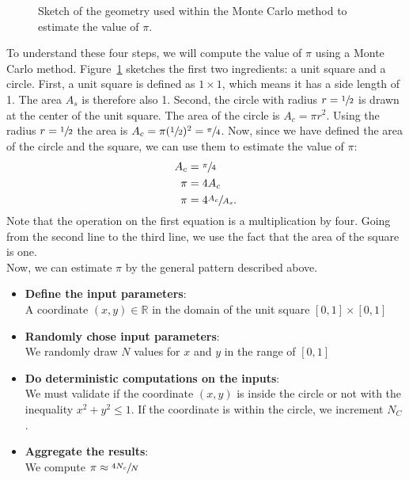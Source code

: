 \begin{figure}[h]
  \begin{center}
  \end{center}
  \caption{Sketch of the geometry used within the Monte Carlo method to estimate the value of $\pi$.}
  \label{fig:monte}
\end{figure}
To understand these four steps, we will compute the value of $\pi$ using a Monte Carlo method. Figure~\ref{fig:monte} sketches the first two ingredients: a unit square and a circle. First, a unit square is defined as $1 \times 1$, which means it has a side length of 1. The area $A_s$ is therefore also 1. Second, the circle with radius $r=\sfrac{1}{2}$ is drawn at the center of the unit square. The area of the circle is $A_c=\pi r^2$. Using the radius $r=\sfrac{1}{2}$ the area is $A_c=\pi(\sfrac{1}{2})^2=\sfrac{\pi}{4}$. Now, since we have defined the area of the circle and the square, we can use them to estimate the value of $\pi$:
\begin{align}
A_c &= \sfrac{\pi}{4} \notag\\
\pi &= 4 A_c \notag\\
\pi &= 4 \sfrac{A_c}{A_s}\text{.}
\end{align}
Note that the operation on the first equation is a multiplication by four. Going from the second line to the third line, we use the fact that the area of the square is one. \\

Now, we can estimate $\pi$ by the general pattern described above.
\begin{itemize}
\item \textbf{Define the input parameters}: \\ A coordinate  $(x,y)\in\mathbb{R}$ in the domain of the unit square $[0,1]\times [0,1]$
\item\textbf{ Randomly chose input parameters}:\\ We randomly draw $N$ values for $x$ and $y$ in the range of $[0,1]$
\item \textbf{Do deterministic computations on the inputs}:  \\
We must validate if the coordinate $(x,y)$ is inside the circle or not with the inequality $x^2+y^2\leq 1$. If the coordinate is within the circle, we increment $N_C$.
\item \textbf{Aggregate the results}: \\
We compute $\pi\approx \sfrac{4N_c}{N}$
\end{itemize}
\vspace{0.25cm}

